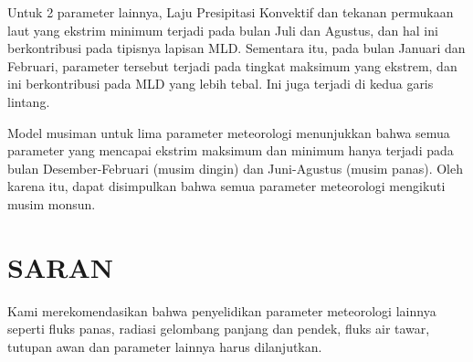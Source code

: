 \begin{spacing}{1.5}
	Untuk 2 parameter lainnya, Laju Presipitasi Konvektif dan tekanan permukaan laut yang ekstrim minimum terjadi pada bulan Juli dan Agustus, dan hal ini berkontribusi pada tipisnya lapisan MLD. Sementara itu, pada bulan Januari dan Februari, parameter tersebut terjadi pada tingkat maksimum yang ekstrem, dan ini berkontribusi pada MLD yang lebih tebal. Ini juga terjadi di kedua garis lintang.
	
	Model musiman untuk lima parameter meteorologi menunjukkan bahwa semua parameter yang mencapai ekstrim maksimum dan minimum hanya terjadi pada bulan Desember-Februari (musim dingin) dan Juni-Agustus (musim panas). Oleh karena itu, dapat disimpulkan bahwa semua parameter meteorologi mengikuti musim monsun.
	
	
\section[Saran]{SARAN}

	Kami merekomendasikan bahwa penyelidikan parameter meteorologi lainnya seperti fluks panas, radiasi gelombang panjang dan pendek, fluks air tawar, tutupan awan dan parameter lainnya harus dilanjutkan.

\end{spacing}